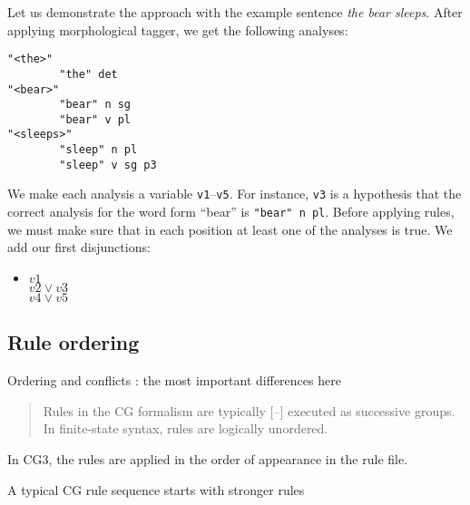 \documentclass[11pt]{article}
\begin{document}
Let us demonstrate the approach with the example sentence 
\emph{the bear sleeps}. After applying morphological tagger, we get the following analyses:

\begin{verbatim}
"<the>"
        "the" det
"<bear>"
        "bear" n sg
        "bear" v pl
"<sleeps>"
        "sleep" n pl
        "sleep" v sg p3
\end{verbatim}

We make each analysis a variable \texttt{v1}--\texttt{v5}. 
For instance, \texttt{v3} is a hypothesis that the correct analysis 
for the word form ``bear'' is \texttt{"bear" n pl}.
Before applying rules, we must make sure that in each position
at least one of the analyses is true. We add our first disjunctions:

\begin{itemize}
\item [] $v1$ \\ $v2 \vee v3$ \\ $v4 \vee v5$
\end{itemize}



\subsection{Rule ordering}
\label{ssec:ordering}

Ordering and conflicts : the most important differences here

\cite{koskenniemi92}
\begin{quote}Rules in the CG formalism are typically [--] executed as successive groups.
In finite-state syntax, rules are logically unordered.\end{quote}


In CG3, the rules are applied in the order of appearance in the rule file.

A typical CG rule sequence starts with stronger rules  






\end{document}
